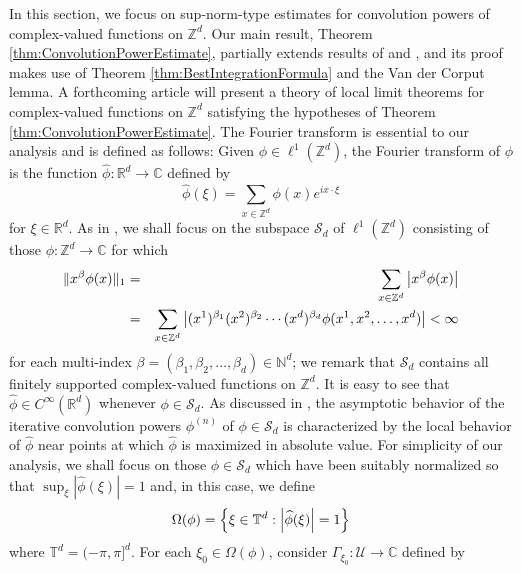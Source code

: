 \documentclass[smallextended]{svjour3}
\theoremstyle{remark}
\begin{document}
\noindent In this section, we focus on sup-norm-type estimates for convolution powers of complex-valued functions on $\mathbb{Z}^d$. Our main result, Theorem \ref{thm:ConvolutionPowerEstimate}, partially extends results of \cite{randles_convolution_2015} and \cite{randles_convolution_2017}, and its proof makes use of Theorem \ref{thm:BestIntegrationFormula} and the Van der Corput lemma. A forthcoming article will present a theory of local limit theorems for complex-valued functions on $\mathbb{Z}^d$ satisfying the hypotheses of Theorem \ref{thm:ConvolutionPowerEstimate}. The Fourier transform is essential to our analysis and is defined as follows: Given $\phi\in\ell^1(\mathbb{Z}^d)$, the Fourier transform of $\phi$ is the function $\widehat{\phi}:\mathbb{R}^d\to\mathbb{C}$ defined by
\begin{equation*}
    \widehat{\phi}(\xi)=\sum_{x\in\mathbb{Z}^d}\phi(x)e^{ix\cdot\xi}
\end{equation*}
for $\xi\in\mathbb{R}^d$. As in \cite{randles_convolution_2017}, we shall focus on the subspace $\mathcal{S}_d$ of $\ell^1(\mathbb{Z}^d)$ consisting of those $\phi:\mathbb{Z}^d\to\mathbb{C}$ for which
\begin{eqnarray*}
    \|x^\beta \phi(x)\|_1&=&\sum_{x\in\mathbb{Z}^d}\abs{x^\beta\phi(x)}\\
    &=&\sum_{x\in\mathbb{Z}^d}\abs{(x^1)^{\beta_1}(x^2)^{\beta_2}\cdots(x^d)^{\beta_d}\phi(x^1,x^2,\dots,x^d)}<\infty
\end{eqnarray*}
for each multi-index $\beta=(\beta_1,\beta_2,\dots,\beta_d)\in\mathbb{N}^d$; we remark that $\mathcal{S}_d$ contains all finitely supported complex-valued functions on $\mathbb{Z}^d$.  It is easy to see that $\widehat{\phi}\in C^\infty(\mathbb{R}^d)$ whenever $\phi\in \mathcal{S}_d$. As discussed in \cite{thomee_stability_1965,diaconis_convolution_2014,randles_convolution_2015,randles_convolution_2017}, the asymptotic behavior of the iterative convolution powers $\phi^{(n)}$ of $\phi\in\mathcal{S}_d$ is characterized by the local behavior of $\widehat{\phi}$ near points at which $\widehat{\phi}$ is maximized in absolute value. For simplicity of our analysis, we shall focus on those $\phi\in\mathcal{S}_d$ which have been suitably normalized so that $\sup_{\xi}|\widehat{\phi}(\xi)|=1$ and, in this case, we define
\begin{equation*}
    \Omega(\phi)=\left\{\xi\in \mathbb{T}^d:\abs{\widehat{\phi}(\xi)}=1\right\}
\end{equation*}
where $\mathbb{T}^d=(-\pi,\pi]^d$. For each $\xi_0\in \Omega(\phi)$, consider $\Gamma_{\xi_0}:\mathcal{U}\to\mathbb{C}$ defined by
\end{document}
